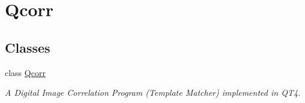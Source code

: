 \hypertarget{group__qcorr__mainwindow}{
\section{Qcorr}
\label{group__qcorr__mainwindow}
}
\subsection*{Classes}
\begin{DoxyCompactItemize}
\item 
class \hyperlink{classQcorr}{Qcorr}
\begin{DoxyCompactList}\small\item\em A Digital Image Correlation Program (Template Matcher) implemented in QT4. \item\end{DoxyCompactList}\end{DoxyCompactItemize}
